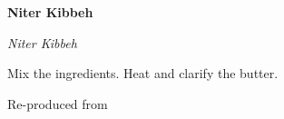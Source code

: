 \documentclass[../recipe-collections/cooking.tex]{subfiles}
\begin{document}
\begin{recipe}{\textbf{Niter Kibbeh}}{}{}

  \freeform{}\textit{Niter Kibbeh}


  Mix the ingredients. Heat and clarify the butter.

  \freeform{}\hrulefill{}

\end{recipe}

Re-produced from  \autocite{youtube_tasty_2019}
\end{document}
